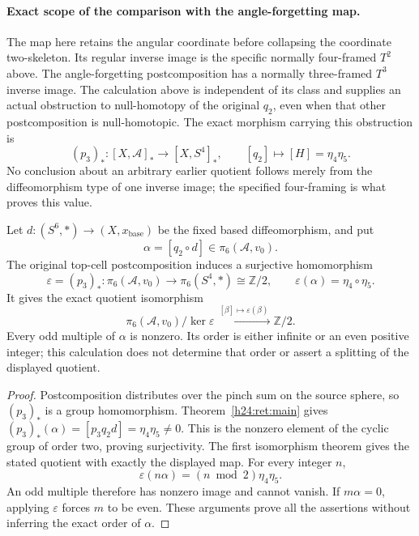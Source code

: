 \paragraph{Exact scope of the comparison with the angle-forgetting map.}
The map here retains the angular coordinate before collapsing the
coordinate two-skeleton.  Its regular inverse image is the specific
normally four-framed \(T^2\) above.  The angle-forgetting
postcomposition has a normally three-framed \(T^3\) inverse image.
The calculation above is independent of its class and supplies an
actual obstruction to null-homotopy of the original \(q_2\), even
when that other postcomposition is null-homotopic.  The exact
morphism carrying this obstruction is
\[
 (p_3)_*:[X,\mathcal A]_*\longrightarrow[X,S^4]_*,\qquad
 [q_2]\longmapsto[H]=\eta_4\eta_5.
\]
No conclusion about an arbitrary earlier quotient follows merely
from the diffeomorphism type of one inverse image; the specified
four-framing is what proves this value.

\begin{corollary}
\label{h24:ret:q2-detected-quotient}
Let \(d:(S^6,*)\to(X,x_{\mathrm{base}})\) be the fixed based
diffeomorphism, and put
\[
\alpha=[q_2\circ d]\in\pi_6(\mathcal A,v_0).
\]
The original top-cell postcomposition induces a surjective homomorphism
\[
\varepsilon=(p_3)_*:\pi_6(\mathcal A,v_0)
  \longrightarrow\pi_6(S^4,*)\cong\mathbb Z/2,
\qquad \varepsilon(\alpha)=\eta_4\circ\eta_5.
\]
It gives the exact quotient isomorphism
\[
\pi_6(\mathcal A,v_0)/\ker\varepsilon
 \xrightarrow{\ [\beta]\mapsto\varepsilon(\beta)\ }
\mathbb Z/2.
\]
Every odd multiple of \(\alpha\) is nonzero. Its order is either
infinite or an even positive integer; this calculation does not determine
that order or assert a splitting of the displayed quotient.
\end{corollary}
\begin{proof}
Postcomposition distributes over the pinch sum on the source sphere,
so \((p_3)_*\) is a group homomorphism. Theorem~\ref{h24:ret:main}
gives \((p_3)_*(\alpha)=[p_3q_2d]=\eta_4\eta_5\ne0\).
This is the nonzero element of the cyclic group of order two, proving
surjectivity. The first isomorphism theorem gives the stated quotient
with exactly the displayed map. For every integer \(n\),
\[
\varepsilon(n\alpha)=(n\bmod2)\eta_4\eta_5.
\]
An odd multiple therefore has nonzero image and cannot vanish.
If \(m\alpha=0\), applying \(\varepsilon\) forces \(m\)
to be even. These arguments prove all the assertions without inferring
the exact order of \(\alpha\).
\end{proof}

